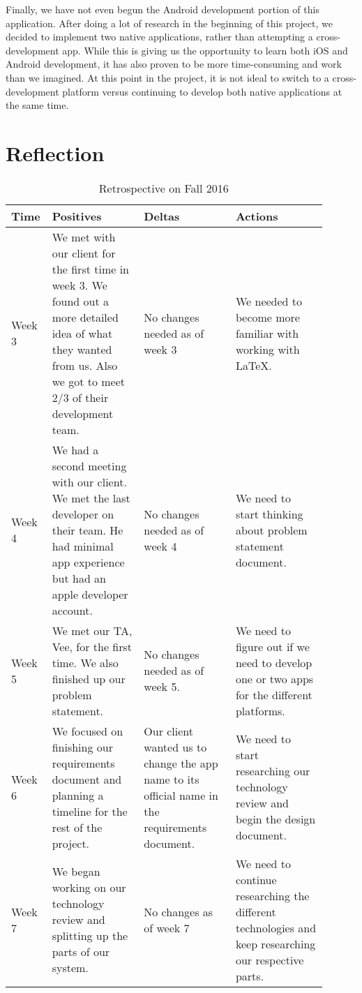 \documentclass[letterpaper,10pt,draftclsnofoot,onecolumn,titlepage]{IEEEtran}
\begin{document}
		Finally, we have not even begun the Android development portion of this application. 
		After doing a lot of research in the beginning of this project, we decided to implement two native applications, rather than attempting a cross-development app. 
		While this is giving us the opportunity to learn both iOS and Android development, it has also proven to be more time-consuming and work than we imagined. 
		At this point in the project, it is not ideal to switch to a cross-development platform versus continuing to develop both native applications at the same time.



		\section{Reflection}
			\begin{table}[H]
			\caption{Retrospective on Fall 2016}
			\begin{center}
				\begin{tabular}{| p{0.06\linewidth} | p{0.28\linewidth} | p{0.28\linewidth} | p{0.28\linewidth} | }
					\hline
					\textbf{Time} & \textbf{Positives} & \textbf{Deltas} & \textbf{Actions} \\ [0.5ex]
					\hline
					Week 3 & We met with our client for the first time in week 3. We found out a more detailed idea of what they wanted from us. Also we got to meet 2/3 of their development team.  & No changes needed as of week 3 & We needed to become more familiar with working with LaTeX. \\
					\hline
					Week 4 & We had a second meeting with our client. We met the last developer on their team. He had minimal app experience but had an apple developer account. & No changes needed as of week 4 & We need to start thinking about problem statement document. \\
					\hline
					Week 5 & We met our TA, Vee, for the first time. We also finished up our problem statement. & No changes needed as of week 5. & We need to figure out if we need to develop one or two apps for the different platforms. \\
					\hline
					Week 6 & We focused on finishing our requirements document and planning a timeline for the rest of the project. & Our client wanted us to change the app name to its official name in the requirements document. & We need to start researching our technology review and begin the design document. \\
					\hline
					Week 7 & We began working on our technology review and splitting up the parts of our system. & No changes as of week 7 & We need to continue researching the different technologies and keep researching our respective parts. \\

\end{tabular}
\end{center}
\end{table}
\end{document}
